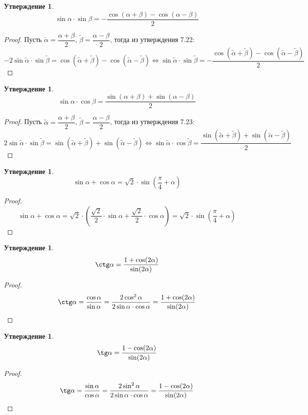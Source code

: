 \documentclass[12pt]{article}
\theoremstyle{definition}
\newtheorem{statement}[theorem]{Утверждение}
\begin{document}
    \begin{statement}
        $$\sin\alpha\cdot\sin\beta=-\dfrac{\cos(\alpha+\beta)-\cos(\alpha-\beta)}{2}$$
    \end{statement}
    \begin{proof}
        Пусть $\tilde{\alpha} = \dfrac{\alpha+\beta}{2}$, $\tilde{\beta} = \dfrac{\alpha-\beta}{2}$, тогда из утверждения 7.22:
        $$-2\sin\tilde{\alpha}\cdot\sin\tilde{\beta}=\cos(\tilde{\alpha}+\tilde{\beta})-\cos(\tilde{\alpha}-\tilde{\beta})\Longleftrightarrow \sin\tilde{\alpha}\cdot\sin\tilde{\beta}=-\dfrac{\cos(\tilde{\alpha}+\tilde{\beta})-\cos(\tilde{\alpha}-\tilde{\beta})}{2}$$
    \end{proof}
    \begin{statement}
        $$\sin\alpha\cdot\cos\beta=\dfrac{\sin(\alpha+\beta)+\sin(\alpha-\beta)}{2}$$
    \end{statement}
    \begin{proof}
        Пусть $\tilde{\alpha} = \dfrac{\alpha+\beta}{2}$, $\tilde{\beta} = \dfrac{\alpha-\beta}{2}$, тогда из утверждения 7.23:
        $$2\sin\tilde{\alpha}\cdot\sin\tilde{\beta}=\sin(\tilde{\alpha}+\tilde{\beta})+\sin(\tilde{\alpha}-\tilde{\beta})\Longleftrightarrow \sin\tilde{\alpha}\cdot\cos\tilde{\beta}=\dfrac{\sin(\tilde{\alpha}+\tilde{\beta})+\sin(\tilde{\alpha}-\tilde{\beta})}{2}$$
    \end{proof}
    \begin{statement}
        $$\sin\alpha+\cos\alpha=\sqrt{2}\cdot\sin\left(\dfrac{\pi}{4}+\alpha\right)$$
    \end{statement}
    \begin{proof}
        $$\sin\alpha+\cos\alpha=\sqrt{2}\cdot\left(\dfrac{\sqrt{2}}{2}\cdot\sin\alpha+\dfrac{\sqrt{2}}{2}\cdot\cos\alpha\right)=\sqrt{2}\cdot\sin\left(\dfrac{\pi}{4}+\alpha\right)$$
    \end{proof}
    \begin{statement}
        $$\ctg\alpha=\dfrac{1+\cos(2\alpha)}{\sin(2\alpha)}$$
    \end{statement}
    \begin{proof}
        $$\ctg\alpha=\dfrac{\cos\alpha}{\sin\alpha}=\dfrac{2\cos^2\alpha}{2\sin\alpha\cdot\cos\alpha}=\dfrac{1+\cos(2\alpha)}{\sin(2\alpha)}$$
    \end{proof}
    \begin{statement}
        $$\tg\alpha=\dfrac{1-\cos(2\alpha)}{\sin(2\alpha)}$$
    \end{statement}
    \begin{proof}
        $$\tg\alpha=\dfrac{\sin\alpha}{\cos\alpha}=\dfrac{2\sin^2\alpha}{2\sin\alpha\cdot\cos\alpha}=\dfrac{1-\cos(2\alpha)}{\sin(2\alpha)}$$
    \end{proof}
\end{document}

